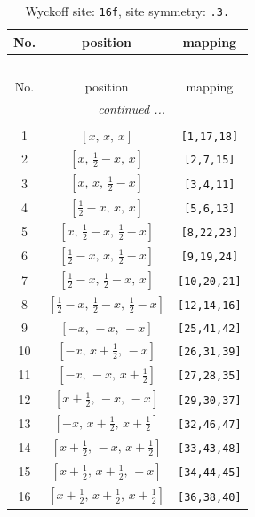 \documentclass[fleqn,8pt]{jsarticle}
\begin{document}
\begin{longtable}{ccc}
\caption{Wyckoff site: {\tt 16f}, site symmetry: {\tt .3.}}
 \\
 \hline \hline
No. & position & mapping \\ \hline \endfirsthead

\multicolumn{2}{l}{\tablename\ \thetable{}} \\
 \hline \hline
No. & position & mapping \\ \hline \endhead

 \hline \hline
\multicolumn{2}{r}{\footnotesize\it continued ...} \\ \endfoot

 \hline \hline
\multicolumn{2}{r}{} \\ \endlastfoot

1 & $\left[ x,\, x,\, x \right]$ & {\tt [1,17,18]} \\ \hline
2 & $\left[ x,\, \frac{1}{2} - x,\, x \right]$ & {\tt [2,7,15]} \\ \hline
3 & $\left[ x,\, x,\, \frac{1}{2} - x \right]$ & {\tt [3,4,11]} \\ \hline
4 & $\left[ \frac{1}{2} - x,\, x,\, x \right]$ & {\tt [5,6,13]} \\ \hline
5 & $\left[ x,\, \frac{1}{2} - x,\, \frac{1}{2} - x \right]$ & {\tt [8,22,23]} \\ \hline
6 & $\left[ \frac{1}{2} - x,\, x,\, \frac{1}{2} - x \right]$ & {\tt [9,19,24]} \\ \hline
7 & $\left[ \frac{1}{2} - x,\, \frac{1}{2} - x,\, x \right]$ & {\tt [10,20,21]} \\ \hline
8 & $\left[ \frac{1}{2} - x,\, \frac{1}{2} - x,\, \frac{1}{2} - x \right]$ & {\tt [12,14,16]} \\ \hline
9 & $\left[ - x,\, - x,\, - x \right]$ & {\tt [25,41,42]} \\ \hline
10 & $\left[ - x,\, x + \frac{1}{2},\, - x \right]$ & {\tt [26,31,39]} \\ \hline
11 & $\left[ - x,\, - x,\, x + \frac{1}{2} \right]$ & {\tt [27,28,35]} \\ \hline
12 & $\left[ x + \frac{1}{2},\, - x,\, - x \right]$ & {\tt [29,30,37]} \\ \hline
13 & $\left[ - x,\, x + \frac{1}{2},\, x + \frac{1}{2} \right]$ & {\tt [32,46,47]} \\ \hline
14 & $\left[ x + \frac{1}{2},\, - x,\, x + \frac{1}{2} \right]$ & {\tt [33,43,48]} \\ \hline
15 & $\left[ x + \frac{1}{2},\, x + \frac{1}{2},\, - x \right]$ & {\tt [34,44,45]} \\ \hline
16 & $\left[ x + \frac{1}{2},\, x + \frac{1}{2},\, x + \frac{1}{2} \right]$ & {\tt [36,38,40]} \\
\end{longtable}
\end{document}
